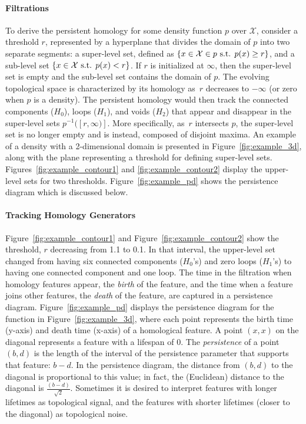 \documentclass[12pt]{article}
\begin{document}
\paragraph{Filtrations}
To derive the persistent homology for some density function $p$ over $\mathcal X$, consider a threshold $r$, represented by a hyperplane that divides the domain of $p$ into two separate segments: a super-level set, defined as $\{ x \in \mathcal X \in p \textup{ s.t. } p(x) \geq r \}$, and a sub-level set $\{x \in \mathcal X \textup{ s.t. } p(x)  <  r \}$. If $r$ is initialized at $\infty$, then the super-level set is empty and the sub-level set contains the domain of $p$. The evolving topological space is characterized by its homology as~$r$ decreases to $-\infty$ (or zero when $p$ is a density). The persistent homology would then track the connected components ($H_{0}$), loops ($H_{1}$), and voids ($H_{2}$) that appear and disappear in the super-level sets $p^{-1}([r,\infty)]$. More specifically, as~$r$ intersects $p$, the super-level set is no longer empty and is instead, composed of disjoint maxima. An example of a density with a 2-dimensional domain is presented in Figure~\ref{fig:example_3d}, along with the plane representing a threshold for defining super-level sets.  Figures~\ref{fig:example_contour1} and \ref{fig:example_contour2} display the upper-level sets for two thresholds.  Figure~\ref{fig:example_pd} shows the persistence diagram which is discussed below.


\paragraph{Tracking Homology Generators}
Figure~\ref{fig:example_contour1} and Figure~\ref{fig:example_contour2} show the threshold, $r$ decreasing from 1.1 to 0.1. In that interval, the upper-level set changed from having six connected components ($H_0$'s) and zero loops ($H_1$'s) to having one connected component and one loop. The time in the filtration when homology features appear, the \emph{birth} of the feature, and the time when a feature joins other features, the \emph{death} of the feature, are captured in a persistence diagram. Figure~\ref{fig:example_pd} displays the persistence diagram for the function in Figure~\ref{fig:example_3d}, where each point represents the birth time (y-axis) and death time (x-axis) of a homological feature. A point $(x,x)$ on the diagonal represents a feature with a lifespan of 0.  The \emph{persistence} of a point $(b,d)$ is the length of the interval of the persistence parameter that supports that feature: $b - d$. In the persistence diagram, the distance from $(b,d)$ to the diagonal is proportional to this value; in fact, the (Euclidean) distance to the diagonal is $\frac{(b-d)}{\sqrt{2}}$. 
Sometimes it is desired to interpret features with longer lifetimes as topological signal, and the features with shorter lifetimes (closer to the diagonal) as topological noise.
\end{document}
